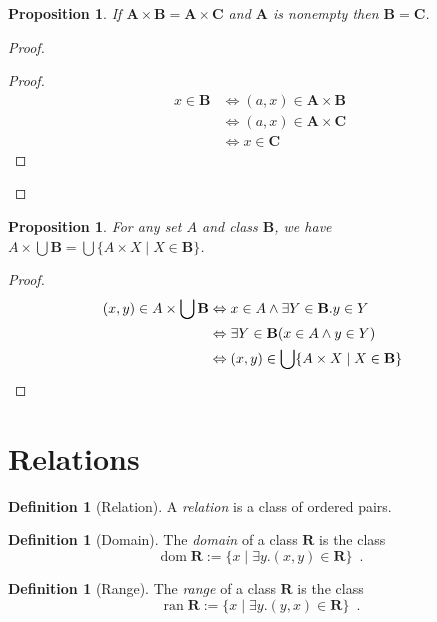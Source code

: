 \documentclass{book}
\let\qed\relax
\newtheorem{prop}[ax]{Proposition}
\theoremstyle{definition}
\newtheorem{df}[ax]{Definition}
\newcommand{\dom}{\ensuremath{\operatorname{dom}}}
\newcommand{\ran}{\ensuremath{\operatorname{ran}}}
\begin{document}
\begin{prop}
If $\mathbf{A} \times \mathbf{B} = \mathbf{A} \times \mathbf{C}$ and $\mathbf{A}$ is nonempty then $\mathbf{B} = \mathbf{C}$.
\end{prop}

\begin{proof}
\pf
{}
\begin{proof}
	\pf
	\begin{align*}
		x \in \mathbf{B} & \Leftrightarrow (a,x) \in \mathbf{A} \times \mathbf{B} \\
		& \Leftrightarrow (a,x) \in \mathbf{A} \times \mathbf{C} \\
		& \Leftrightarrow x \in \mathbf{C}
	\end{align*}
\end{proof}
\qed
\end{proof}

\begin{prop}
For any set $A$ and class $\mathbf{B}$, we have $A \times \bigcup \mathbf{B} = \bigcup \{A \times X \mid X \in \mathbf{B}\}$.
\end{prop}

\begin{proof}
\pf
\begin{align*}
(x,y) \in A \times \bigcup \mathbf{B} & \Leftrightarrow x \in A \wedge \exists Y \in \mathbf{B}. y \in Y \\
& \Leftrightarrow \exists Y \in \mathbf{B} (x \in A \wedge y \in Y) \\
& \Leftrightarrow (x,y) \in \bigcup \{A \times X \mid X \in \mathbf{B}\} & \qed
\end{align*}
\end{proof}

\section{Relations}

\begin{df}[Relation]
A \emph{relation} is a class of ordered pairs.
\end{df}

\begin{df}[Domain]
The \emph{domain} of a class $\mathbf{R}$ is the class
\[ \dom \mathbf{R} := \{ x \mid \exists y. (x,y) \in \mathbf{R} \} \enspace . \]
\end{df}

\begin{df}[Range]
The \emph{range} of a class $\mathbf{R}$ is the class
\[ \ran \mathbf{R} := \{ x \mid \exists y. (y,x) \in \mathbf{R} \} \enspace . \]
\end{df}
\end{document}
